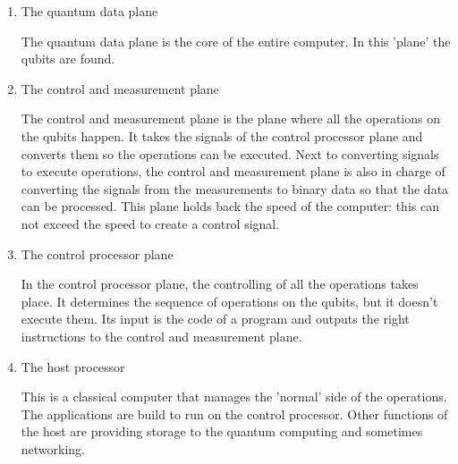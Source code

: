 \begin{enumerate}
    \item The quantum data plane

        \quad The quantum data plane is the core of the entire computer. In this 'plane' the qubits are found.

         
    \item The control and measurement plane

        \quad The control and measurement plane is the plane where all the operations on the qubits happen. It takes the signals of the control processor plane and converts them so the operations can be executed.
        Next to converting signals to execute operations, the control and measurement plane is also in charge of converting the signals from the measurements to binary data so that the data can be processed.
        This plane holds back the speed of the computer: this can not exceed the speed to create a control signal.

    \item The control processor plane

        \quad In the control processor plane, the controlling of all the operations takes place. It determines the sequence of operations on the qubits, but it doesn't execute them. Its input is the code of a program and outputs the right instructions to the control and measurement plane.

    \item The host processor

        \quad This is a classical computer that manages the 'normal' side of the operations. The applications are build to run on the control processor. Other functions of the host are providing storage to the quantum computing and sometimes networking.

\end{enumerate}